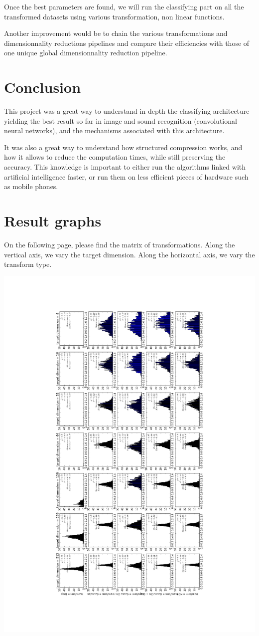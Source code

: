 \documentclass[11pt,a4paper]{article}
\begin{document}
	
Once the best parameters are found, we will run the classifying part on all the transformed datasets using various transformation, non linear functions.
	
	Another improvement would be to chain the various transformations and dimensionnality reductions pipelines and compare their efficiencies with those of one unique global dimensionnality reduction pipeline.
	
	
	\section{Conclusion}
This project was a great way to understand in depth the classifying architecture yielding the best result so far in image and sound recognition (convolutional neural networks), and the mechanisms associated with this architecture.

It was also a great way to understand how structured compression works, and how it allows to reduce the computation times, while still preserving the accuracy. This knowledge is important to either run the algorithms linked with artificial intelligence faster, or run them on less efficient pieces of hardware such as mobile phones.


\appendix
\section{Result graphs}
\label{graphs}

On the following page, please find the matrix of transformations. Along the vertical axis, we vary the target dimension. Along the horizontal axis, we vary the transform type.

\vspace*{-8cm}\hspace*{-7cm}
\includegraphics[scale =1.2]{img/annex2.pdf}

	\newpage
	\nocite{*}
	\printbibliography
\end{document}
